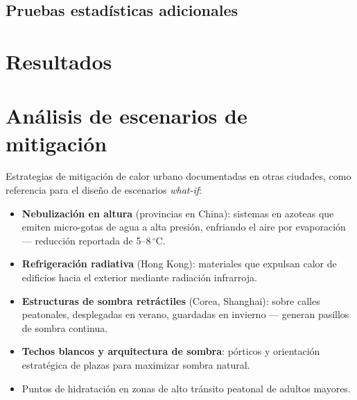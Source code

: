 \documentclass[11pt,a4paper]{article}
\begin{document}
\subsection{Pruebas estadísticas adicionales}


\section{Resultados}

\section{Análisis de escenarios de mitigación}
\label{sec:mitigacion}


Estrategias de mitigación de calor urbano documentadas en otras ciudades,
como referencia para el diseño de escenarios \emph{what-if}:

\begin{itemize}[leftmargin=*]
    \item \textbf{Nebulización en altura} (provincias en China): sistemas en
        azoteas que emiten micro-gotas de agua a alta presión, enfriando el
        aire por evaporación --- reducción reportada de 5--8$\,^\circ$C.
    \item \textbf{Refrigeración radiativa} (Hong Kong): materiales que
        expulsan calor de edificios hacia el exterior mediante radiación
        infrarroja.
    \item \textbf{Estructuras de sombra retráctiles} (Corea, Shanghai):
        sobre calles peatonales, desplegadas en verano, guardadas en
        invierno --- generan pasillos de sombra continua.
    \item \textbf{Techos blancos y arquitectura de sombra}: pórticos y
        orientación estratégica de plazas para maximizar sombra natural.
    \item Puntos de hidratación en zonas de alto tránsito peatonal de
        adultos mayores.
\end{itemize}
\end{document}
